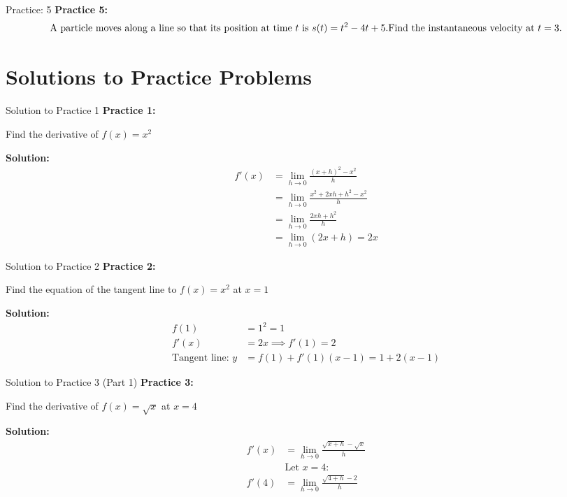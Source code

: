 \documentclass[aspectratio=169]{beamer}
\begin{document}
\begin{frame}{Practice: 5}
\textbf{Practice 5:}
\[
\text{A particle moves along a line so that its position at time $t$ is } s(t) = t^2 - 4t + 5. \\
\text{Find the instantaneous velocity at } t=3.
\]
\end{frame}

\section{Solutions to Practice Problems}

\begin{frame}{Solution to Practice 1}
\textbf{Practice 1:}

Find the derivative of $f(x) = x^2$

\textbf{Solution:}
\[
\begin{aligned}
  f'(x) &= \lim_{h \to 0} \frac{(x + h)^2 - x^2}{h} \\
        &= \lim_{h \to 0} \frac{x^2 + 2xh + h^2 - x^2}{h} \\
        &= \lim_{h \to 0} \frac{2xh + h^2}{h} \\
        &= \lim_{h \to 0} (2x + h) = 2x
\end{aligned}
\]
\end{frame}

\begin{frame}{Solution to Practice 2}
\textbf{Practice 2:}

Find the equation of the tangent line to $f(x) = x^2$ at $x = 1$

\textbf{Solution:}
\[
\begin{aligned}
  f(1) &= 1^2 = 1 \\
  f'(x) &= 2x \implies f'(1) = 2 \\
  \text{Tangent line: } y &= f(1) + f'(1)(x-1) = 1 + 2(x-1)
\end{aligned}
\]
\end{frame}

\begin{frame}{Solution to Practice 3 (Part 1)}
\textbf{Practice 3:}

Find the derivative of $f(x) = \sqrt{x}$ at $x=4$

\textbf{Solution:}
\[
\begin{aligned}
  f'(x) &= \lim_{h \to 0} \frac{\sqrt{x+h} - \sqrt{x}}{h} \\
  &\text{Let } x=4: \\
  f'(4) &= \lim_{h \to 0} \frac{\sqrt{4+h} - 2}{h}
\end{aligned}
\]
\end{frame}
\end{document}
